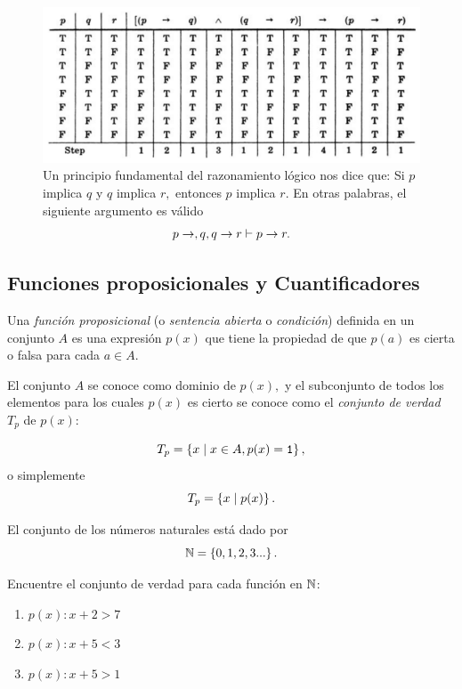 	\begin{figure}
		\centering
		\includegraphics[width=0.7\linewidth]{md/tabla_silogismo}
		\caption{
			  Un principio fundamental del razonamiento lógico nos dice que:
				Si $p$ implica $q$ y $q$ implica $r,$ entonces $p$ implica $r.$ 
			En otras palabras, el siguiente argumento es válido
			$$
			p\rightarrow,q, q\rightarrow r \vdash p \rightarrow r.
			$$ }
		\label{fig:tabla_silogismo}
	\end{figure}

\subsection{Funciones proposicionales y Cuantificadores}


 Una \emph{función proposicional} (o \emph{sentencia abierta} o \emph{condición}) definida en un conjunto $A$ es una expresión $p(x)$ que tiene la propiedad de que $p(a)$ es cierta o falsa para cada $a \in A.$



 El conjunto $A$ se conoce como dominio de $p(x),$ y el subconjunto de todos los elementos para los cuales $p(x)$ es cierto se conoce como el \emph{conjunto de verdad} $T_{p}$ de $p(x):$
 
 $$T_{p}=\left\{ x \mid x\in A, p(x)=\texttt{1} \right\},$$ 
 o simplemente 
 $$
 T_{p}=\left\{ x \mid p(x) \right\}.
 $$


\begin{defn}
	El conjunto de los números naturales está dado por
	\[ \mathbb{N} = \left\{ 0,1,2,3... \right\} .\]	
	
\end{defn}

 \begin{problema}
  \label{lip:exmp:4.7}
  Encuentre el conjunto de verdad para cada función en $\mathbb{N}$:
  \begin{enumerate}
   \item $p(x): x+2>7$ 
   \item $p(x): x+5<3$ 
   \item $p(x): x+5>1$ 
  \end{enumerate}

 \end{problema}



